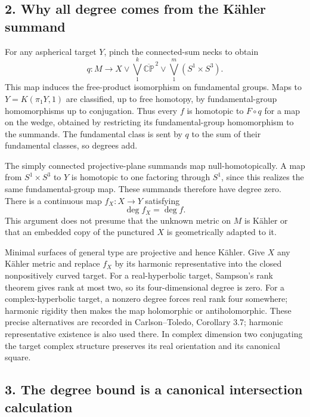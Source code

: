 \documentclass[
  11pt,
]{article}
\begin{document}
\hypertarget{why-all-degree-comes-from-the-kuxe4hler-summand}{%
\subsection{2. Why all degree comes from the Kähler
summand}\label{why-all-degree-comes-from-the-kuxe4hler-summand}}

For any aspherical target \(Y\), pinch the connected-sum necks to obtain
\[
 q:M\longrightarrow
 X\vee\bigvee_{1}^{k}\overline{\mathbb {CP}}^{\,2}
      \vee\bigvee_{1}^{m}(S^1\times S^3).
\] This map induces the free-product isomorphism on fundamental groups.
Maps to \(Y=K(\pi_1Y,1)\) are classified, up to free homotopy, by
fundamental-group homomorphisms up to conjugation. Thus every \(f\) is
homotopic to \(F\circ q\) for a map on the wedge, obtained by
restricting its fundamental-group homomorphism to the summands. The
fundamental class is sent by \(q\) to the sum of their fundamental
classes, so degrees add.

The simply connected projective-plane summands map null-homotopically. A
map from \(S^1\times S^3\) to \(Y\) is homotopic to one factoring
through \(S^1\), since this realizes the same fundamental-group map.
These summands therefore have degree zero. There is a continuous map
\(f_X:X\to Y\) satisfying \[
 \deg f_X=\deg f.                                        \tag{3}
\] This argument does not presume that the unknown metric on \(M\) is
Kähler or that an embedded copy of the punctured \(X\) is geometrically
adapted to it.

Minimal surfaces of general type are projective and hence Kähler. Give
\(X\) any Kähler metric and replace \(f_X\) by its harmonic
representative into the closed nonpositively curved target. For a
real-hyperbolic target, Sampson's rank theorem gives rank at most two,
so its four-dimensional degree is zero. For a complex-hyperbolic target,
a nonzero degree forces real rank four somewhere; harmonic rigidity then
makes the map holomorphic or antiholomorphic. These precise alternatives
are recorded in Carlson--Toledo, Corollary 3.7; harmonic representative
existence is also used there. In complex dimension two conjugating the
target complex structure preserves its real orientation and its
canonical square.

\hypertarget{the-degree-bound-is-a-canonical-intersection-calculation}{%
\subsection{3. The degree bound is a canonical intersection
calculation}\label{the-degree-bound-is-a-canonical-intersection-calculation}}
\end{document}
